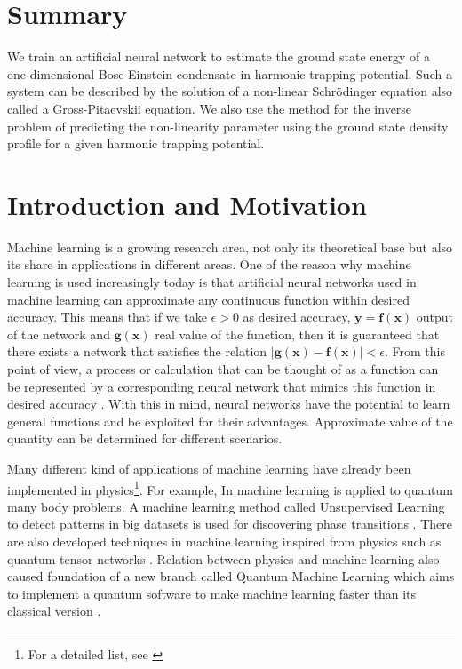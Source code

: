 \documentclass[a4paper,times,12pt]{article}
\begin{document}
\setcounter{page}{1}

\section*{Summary}

We train an artificial neural network to estimate the ground state energy
of a one-dimensional Bose-Einstein condensate in harmonic trapping potential.
Such a system can be described by the solution of a non-linear Schr{\"o}dinger equation also called a Gross-Pitaevskii equation. We also use the method for the inverse problem of predicting the non-linearity parameter using the ground
state density profile for a given harmonic trapping potential.

\newpage
\tableofcontents

\newpage

\section{Introduction and Motivation}
\label{sec:Intro}

Machine learning is a growing research area, not only its theoretical base but also its share in applications in different areas. One of the reason why machine learning is used increasingly today is that artificial neural networks used in machine learning can approximate any continuous function within desired accuracy. This means that if we take $\epsilon > 0$ as desired accuracy,  $\boldsymbol{y} = \boldsymbol{f}(\boldsymbol{x})$ output of the network and $\boldsymbol{g}(\boldsymbol{x})$ real value of the function, then it is guaranteed that there exists a network that satisfies the relation $|\boldsymbol{g}(\boldsymbol{x}) - \boldsymbol{f}(\boldsymbol{x})| < \epsilon $. From this point of view, a process or calculation that can be thought of as a function can be represented by a corresponding neural network that mimics this function in desired accuracy \cite{nielsen2015neural}. With this in mind, neural networks have the potential to learn general functions and be exploited for their advantages. Approximate value of the quantity can be determined for different scenarios.

Many different kind of applications of machine learning have already been implemented in physics\footnote{For a detailed list, see \cite{physicsml}}. For example, In \cite{carleo2017solving, cai2017approximating} machine learning is applied to quantum many body problems. A machine learning method called Unsupervised Learning to detect patterns in big datasets is used for discovering phase transitions \cite{wang2016discovering}. There are also developed techniques in machine learning inspired from physics such as quantum tensor networks \cite{stoudenmire2016supervised}. Relation between physics and machine learning also caused foundation of a new branch called Quantum Machine Learning which aims to implement a quantum software to make machine learning faster than its classical version \cite{biamonte1611quantum}. 
\end{document}
